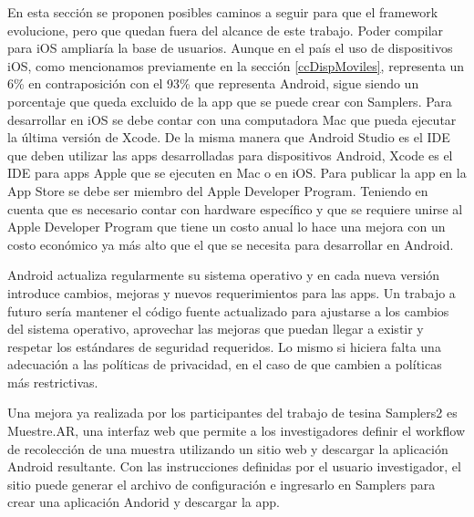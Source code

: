 En esta sección se proponen posibles caminos a seguir para que el framework evolucione, pero que quedan fuera del alcance de este trabajo. Poder compilar para iOS ampliaría la base de usuarios. Aunque en el país el uso de dispositivos iOS, como mencionamos previamente en la sección \ref{ccDispMoviles}, representa un 6\% en contraposición con el 93\% que representa Android, sigue siendo un porcentaje que queda excluido de la app que se puede crear con Samplers. Para desarrollar en iOS se debe contar con una computadora Mac que pueda ejecutar la última versión de Xcode. De la misma manera que Android Studio es el IDE que deben utilizar las apps desarrolladas para dispositivos Android, Xcode es el IDE para apps Apple que se ejecuten en Mac o en iOS. Para publicar la app en la App Store se debe ser miembro del Apple Developer Program. Teniendo en cuenta que es necesario contar con hardware específico \cite{appleDeveloper} y que se requiere unirse al Apple Developer Program que tiene un costo anual \cite{appleEnrollment} lo hace una mejora con un costo económico ya más alto que el que se necesita para desarrollar en Android. 

Android actualiza regularmente su sistema operativo y en cada nueva versión introduce cambios, mejoras y nuevos requerimientos para las apps. Un trabajo a futuro sería mantener el código fuente actualizado para ajustarse a los cambios del sistema operativo, aprovechar las mejoras que puedan llegar a existir y respetar los estándares de seguridad requeridos. Lo mismo si hiciera falta una adecuación a las políticas de privacidad, en el caso de que cambien a políticas más restrictivas. 

Una mejora ya realizada por los participantes del trabajo de tesina Samplers2 es Muestre.AR, una interfaz web que permite a los investigadores definir el workflow de recolección de una muestra utilizando un sitio web y descargar la aplicación Android resultante. Con las instrucciones definidas por el usuario investigador, el sitio puede generar el archivo de configuración e ingresarlo en Samplers para crear una aplicación Andorid y descargar la app. \cite{samplers2}



